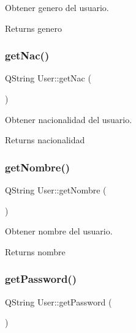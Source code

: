 Obtener genero del usuario. 

\begin{DoxyReturn}{Returns}
genero 
\end{DoxyReturn}
\mbox{\label{classUser_a35bb4fee2f8b12cf69eb25b7949cd85c}} 
\subsubsection{\texorpdfstring{get\+Nac()}{getNac()}}
{\footnotesize\ttfamily Q\+String User\+::get\+Nac (\begin{DoxyParamCaption}{ }\end{DoxyParamCaption})}



Obtener nacionalidad del usuario. 

\begin{DoxyReturn}{Returns}
nacionalidad 
\end{DoxyReturn}
\mbox{\label{classUser_a3cc589543a052946a1255135f855b61f}} 
\subsubsection{\texorpdfstring{get\+Nombre()}{getNombre()}}
{\footnotesize\ttfamily Q\+String User\+::get\+Nombre (\begin{DoxyParamCaption}{ }\end{DoxyParamCaption})}



Obtener nombre del usuario. 

\begin{DoxyReturn}{Returns}
nombre 
\end{DoxyReturn}
\mbox{\label{classUser_a96d673c7c62ecdfdd4c509db8350262d}} 
\subsubsection{\texorpdfstring{get\+Password()}{getPassword()}}
{\footnotesize\ttfamily Q\+String User\+::get\+Password (\begin{DoxyParamCaption}{ }\end{DoxyParamCaption})}



